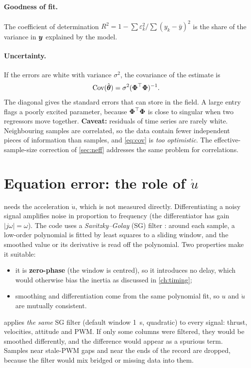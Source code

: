 \paragraph{Goodness of fit.} The coefficient of determination
$R^2 = 1 - \sum\varepsilon_k^2/\sum(y_k - \bar y)^2$ is the share of the variance in $\boldsymbol{y}$
explained by the model.

\paragraph{Uncertainty.} If the errors are white with variance $\sigma^2$, the covariance of the
estimate is
\begin{equation}
  \mathrm{Cov}(\hat{\boldsymbol{\theta}}) = \sigma^2(\boldsymbol{\Phi}^\top\boldsymbol{\Phi})^{-1}.
  \label{eq:cov}
\end{equation}
The diagonal gives the standard errors that  can store in the
 field. A large entry flags a poorly excited parameter, because
$\boldsymbol{\Phi}^\top\boldsymbol{\Phi}$ is close to singular when two regressors move together.
\textbf{Caveat:} residuals of time series are rarely white. Neighbouring samples are correlated,
so the data contain fewer independent pieces of information than samples, and
\eqref{eq:cov} is \emph{too optimistic}. The effective-sample-size correction of
\cref{sec:neff} addresses the same problem for correlations.

\section{Equation error: the role of \texorpdfstring{$\dot u$}{du/dt}}

 needs the acceleration $\dot u$, which is not measured directly.
Differentiating a noisy signal amplifies noise in proportion to frequency (the
differentiator has gain $|j\omega| = \omega$). The code uses a \emph{Savitzky--Golay} (SG)
filter \cite{savitzky1964}: around each sample, a low-order polynomial is fitted by least
squares to a sliding window, and the smoothed value or its derivative is read off the
polynomial. Two properties make it suitable:
\begin{itemize}
  \item it is \textbf{zero-phase} (the window is centred), so it introduces no delay, which would
        otherwise bias the inertia as discussed in \cref{ch:timing};
  \item smoothing and differentiation come from the same polynomial fit, so $u$ and $\dot u$
        are mutually consistent.
\end{itemize}
 applies \emph{the same} SG filter (default window \qty{1}{\second},
quadratic) to every signal: thrust, velocities, attitude and PWM. If only some columns were
filtered, they would be smoothed differently, and the difference would appear as a spurious
term. Samples near stale-PWM gaps and near the ends of the record are dropped, because the
filter would mix bridged or missing data into them.

